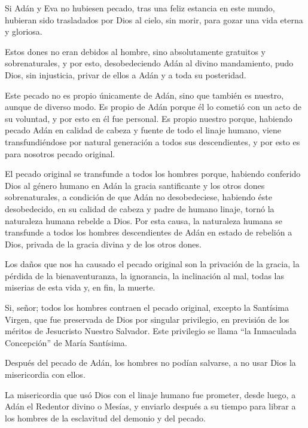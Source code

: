  Si Adán y Eva no hubiesen pecado, tras una feliz estancia en este
mundo, hubieran sido trasladados por Dios al cielo, sin morir, para gozar una vida
eterna y gloriosa.

 Estos dones no eran debidos al
hombre, sino absolutamente gratuitos y sobrenaturales, y por esto,
desobedeciendo Adán al divino mandamiento, pudo Dios, sin injusticia, privar de
ellos a Adán y a toda su posteridad.

 Este pecado no es propio
únicamente de Adán, sino que también es nuestro, aunque de diverso modo. Es
propio de Adán porque él lo cometió con un acto de su voluntad, y por esto en él
fue personal. Es propio nuestro porque, habiendo pecado Adán en calidad de
cabeza y fuente de todo el linaje humano, viene transfundiéndose por natural
generación a todos sus descendientes, y por esto es para nosotros pecado original.

 El pecado original se transfunde a todos los hombres porque,
habiendo conferido Dios al género humano en Adán la gracia santificante y los
otros dones sobrenaturales, a condición de que Adán no desobedeciese, habiendo
éste desobedecido, en su calidad de cabeza y padre de humano linaje, tornó la
naturaleza humana rebelde a Dios. Por esta causa, la naturaleza humana se
transfunde a todos los hombres descendientes de Adán en estado de rebelión a
Dios, privada de la gracia divina y de los otros dones.

 Los daños que nos ha
causado el pecado original son la privación de la gracia, la pérdida de la
bienaventuranza, la ignorancia, la inclinación al mal, todas las miserias de esta vida y, en fin, la muerte.

 Si, señor; todos los
hombres contraen el pecado original, excepto la Santísima Virgen, que fue
preservada de Dios por singular privilegio, en previsión de los méritos de
Jesucristo Nuestro Salvador. Este privilegio se llama “la Inmaculada Concepción”
de María Santísima.

 Después
del pecado de Adán, los hombres no podían salvarse, a no usar Dios la
misericordia con ellos.

 La
misericordia que usó Dios con el linaje humano fue prometer, desde luego, a
Adán el Redentor divino o Mesías, y enviarlo después a su tiempo para librar a los
hombres de la esclavitud del demonio y del pecado.

